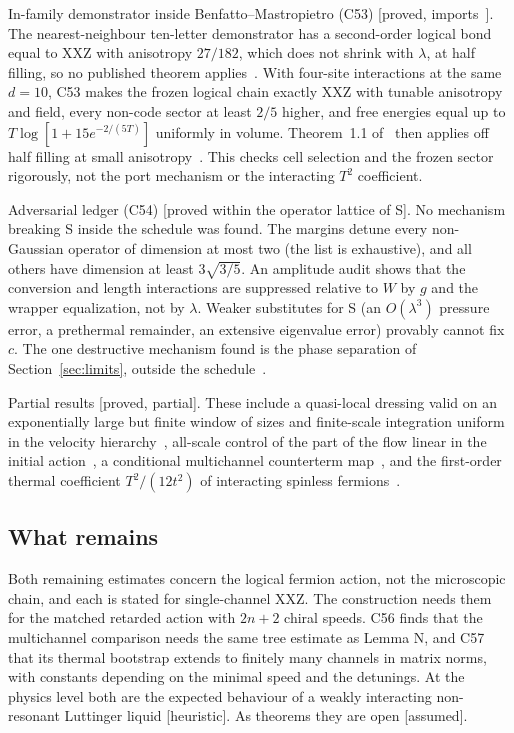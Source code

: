 \documentclass[11pt]{article}
\theoremstyle{definition}
\newcommand{\st}[1]{\textup{[\textsf{#1}]}}
\begin{document}
In-family demonstrator inside Benfatto--Mastropietro (C53) \st{proved, imports~\cite{BM09}}. The nearest-neighbour ten-letter demonstrator has a second-order logical bond equal to XXZ with anisotropy $27/182$, which does not shrink with $\lambda$, at half filling, so no published theorem applies~\cite{C53}. With four-site interactions at the same $d=10$, C53 makes the frozen logical chain exactly XXZ with tunable anisotropy and field, every non-code sector at least $2/5$ higher, and free energies equal up to $T\log[1+15e^{-2/(5T)}]$ uniformly in volume. Theorem~1.1 of~\cite{BM09} then applies off half filling at small anisotropy~\cite{C53}. This checks cell selection and the frozen sector rigorously, not the port mechanism or the interacting $T^2$ coefficient.

Adversarial ledger (C54) \st{proved within the operator lattice of S}. No mechanism breaking S inside the schedule was found. The margins detune every non-Gaussian operator of dimension at most two (the list is exhaustive), and all others have dimension at least $3\sqrt{3/5}$. An amplitude audit shows that the conversion and length interactions are suppressed relative to $W$ by $g$ and the wrapper equalization, not by $\lambda$. Weaker substitutes for S (an $O(\lambda^3)$ pressure error, a prethermal remainder, an extensive eigenvalue error) provably cannot fix $c$. The one destructive mechanism found is the phase separation of Section~\ref{sec:limits}, outside the schedule~\cite{C54}.

Partial results \st{proved, partial}. These include a quasi-local dressing valid on an exponentially large but finite window of sizes and finite-scale integration uniform in the velocity hierarchy~\cite{C49}, all-scale control of the part of the flow linear in the initial action~\cite{C55}, a conditional multichannel counterterm map~\cite{C56}, and the first-order thermal coefficient $T^2/(12t^2)$ of interacting spinless fermions~\cite{C57}.

\subsection{What remains}
\label{sec:remain}

Both remaining estimates concern the logical fermion action, not the microscopic chain, and each is stated for single-channel XXZ. The construction needs them for the matched retarded action with $2n+2$ chiral speeds. C56 finds that the multichannel comparison needs the same tree estimate as Lemma N, and C57 that its thermal bootstrap extends to finitely many channels in matrix norms, with constants depending on the minimal speed and the detunings. At the physics level both are the expected behaviour of a weakly interacting non-resonant Luttinger liquid \st{heuristic}. As theorems they are open \st{assumed}.
\end{document}
